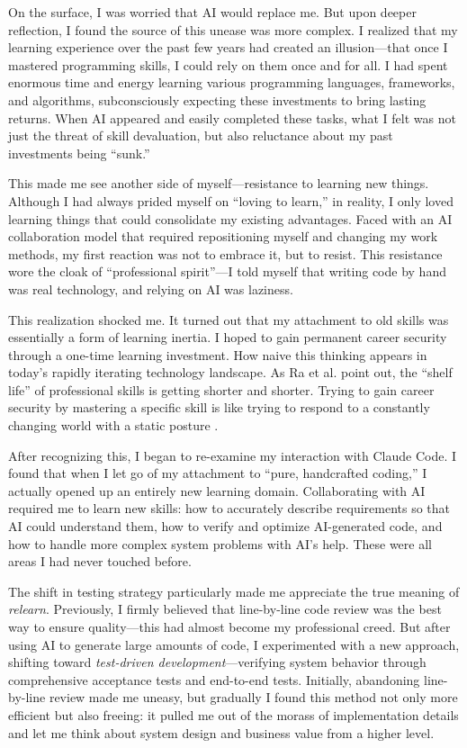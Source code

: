 \documentclass[12pt,a4paper]{article}
\begin{document}
On the surface, I was worried that AI would replace me. But upon deeper reflection, I found the source of this unease was more complex. I realized that my learning experience over the past few years had created an illusion---that once I mastered programming skills, I could rely on them once and for all. I had spent enormous time and energy learning various programming languages, frameworks, and algorithms, subconsciously expecting these investments to bring lasting returns. When AI appeared and easily completed these tasks, what I felt was not just the threat of skill devaluation, but also reluctance about my past investments being ``sunk.''

This made me see another side of myself---resistance to learning new things. Although I had always prided myself on ``loving to learn,'' in reality, I only loved learning things that could consolidate my existing advantages. Faced with an AI collaboration model that required repositioning myself and changing my work methods, my first reaction was not to embrace it, but to resist. This resistance wore the cloak of ``professional spirit''---I told myself that writing code by hand was real technology, and relying on AI was laziness.

This realization shocked me. It turned out that my attachment to old skills was essentially a form of learning inertia. I hoped to gain permanent career security through a one-time learning investment. How naive this thinking appears in today’s rapidly iterating technology landscape. As Ra et al. point out, the ``shelf life'' of professional skills is getting shorter and shorter. Trying to gain career security by mastering a specific skill is like trying to respond to a constantly changing world with a static posture \citep{ra2019technology}.

After recognizing this, I began to re-examine my interaction with Claude Code. I found that when I let go of my attachment to ``pure, handcrafted coding,'' I actually opened up an entirely new learning domain. Collaborating with AI required me to learn new skills: how to accurately describe requirements so that AI could understand them, how to verify and optimize AI-generated code, and how to handle more complex system problems with AI’s help. These were all areas I had never touched before.

The shift in testing strategy particularly made me appreciate the true meaning of \emph{relearn}. Previously, I firmly believed that line-by-line code review was the best way to ensure quality---this had almost become my professional creed. But after using AI to generate large amounts of code, I experimented with a new approach, shifting toward \emph{test-driven development}---verifying system behavior through comprehensive acceptance tests and end-to-end tests. Initially, abandoning line-by-line review made me uneasy, but gradually I found this method not only more efficient but also freeing: it pulled me out of the morass of implementation details and let me think about system design and business value from a higher level.
\end{document}
